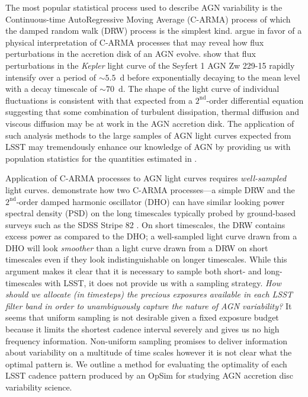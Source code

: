 \documentclass[times,preprint]{aastex}
\begin{document}
The most popular statistical process used to describe AGN variability is the Continuous-time AutoRegressive Moving Average (C-ARMA) process \citep{Kelly14, Brockwell14} of which the damped random walk (DRW) process \citep{Kelly09} is the simplest kind. \citet{KasliwalCARMA} argue in favor of a physical interpretation of C-ARMA processes that may reveal how flux perturbations in the accretion disk of an AGN evolve. \citet{KasliwalCARMA} show that flux perturbations in the \textit{Kepler} light curve of the Seyfert 1 AGN Zw 229-15 rapidly intensify over a period of $\sim 5.5$~d before exponentially decaying to the mean level with a decay timescale of $\sim 70$~d. The shape of the light curve of individual fluctuations is consistent with that expected from a $2^{\mathrm{nd}}$-order differential equation suggesting that some combination of turbulent dissipation, thermal diffusion and viscous diffusion may be at work in the AGN accretion disk. The application of such analysis methods to the large samples of AGN light curves expected from LSST may tremendously enhance our knowledge of AGN by providing us with population statistics for the quantities estimated in \citet{KasliwalCARMA}.

Application of C-ARMA processes to AGN light curves requires \textit{well-sampled} light curves. \citet{KasliwalCARMA} demonstrate how two C-ARMA processes---a simple DRW and the $2^{\mathrm{nd}}$-order damped harmonic oscillator (DHO) can have similar looking power spectral density (PSD) on the long timescales typically probed by ground-based surveys such as the SDSS Stripe 82 \citep{S82}. On short timescales, the DRW contains excess power as compared to the DHO; a well-sampled light curve drawn from a DHO will look \textit{smoother} than a light curve drawn from a DRW on short timescales even if they look indistinguishable on longer timescales. While this argument makes it clear that it is necessary to sample both short- and long-timescales with LSST, it does not provide us with a sampling strategy. \textit{How should we allocate (in timesteps) the precious exposures available in each LSST filter band in order to unambiguously capture the nature of AGN variability?} It seems that uniform sampling is not desirable given a fixed exposure budget because it limits the shortest cadence interval severely and gives us no high frequency information. Non-uniform sampling promises to deliver information about variability on a multitude of time scales however it is not clear what the optimal pattern is. We outline a method for evaluating the optimality of each LSST cadence pattern produced by an OpSim for studying AGN accretion disc variability science.
\end{document}
